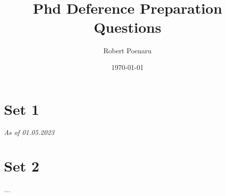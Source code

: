 \documentclass[a4paper,12pt]{article}
\author{Robert Poenaru}
\date{\today}
\title{Phd Deference Preparation\\Questions}
\begin{document}
\maketitle

\tableofcontents

\section{Set 1}
\textit{As of 01.05.2023}

\section{Set 2}
\textit{...}
\end{document}
